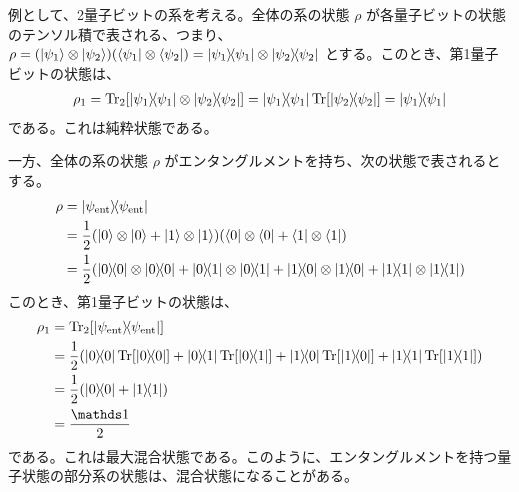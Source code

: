 例として、2量子ビットの系を考える。全体の系の状態 $\rho$ が各量子ビットの状態のテンソル積で表される、つまり、$\rho = (\ket{\psi_1}\otimes\ket{\psi_2})(\bra{\psi_1}\otimes\bra{\psi_2}) = \dyad{\psi_1} \otimes \dyad{\psi_2}$ とする。このとき、第1量子ビットの状態は、
\begin{align*}
    \rho_1 = \Tr_2[\dyad{\psi_1} \otimes \dyad{\psi_2}] = \dyad{\psi_1} \Tr[\dyad{\psi_2}] = \dyad{\psi_1}
\end{align*}
である。これは純粋状態である。

一方、全体の系の状態 $\rho$ がエンタングルメントを持ち、次の状態で表されるとする。
\begin{align*}
    \rho &= \dyad{\psi_{\mathrm{ent}}}\\
    &= \frac{1}{2}\qty(\kten{0}{0} + \kten{1}{1})(\bten{0}{0} + \bten{1}{1})\\
    &= \frac12(\dyad0\ot\dyad0 + \dyad{0}{1}\ot\dyad{0}{1} + \dyad{1}{0}\ot\dyad{1}{0} + \dyad1\ot\dyad1) 
\end{align*}
このとき、第1量子ビットの状態は、
\begin{align*}
    \rho_1 &= \Tr_2[\dyad{\psi_{\mathrm{ent}}}]\\
    &= \frac12(\dyad0\Tr[\dyad0] + \dyad{0}{1}\Tr[\dyad{0}{1}] + \dyad{1}{0}\Tr[\dyad{1}{0}] + \dyad1\Tr[\dyad1])\\
    &= \frac12(\dyad0 + \dyad1)\\
    &= \frac{\bbid}{2}
\end{align*}
である。これは最大混合状態である。このように、エンタングルメントを持つ量子状態の部分系の状態は、混合状態になることがある。



